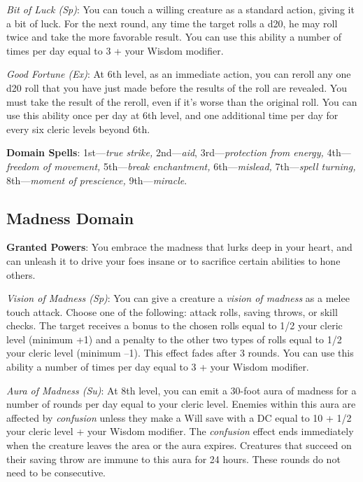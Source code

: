 \textit{Bit of Luck (Sp)}: You can touch a willing creature as a standard action, giving it a bit of luck. For 
the next round, any time the target rolls a d20, he may roll twice and take the more favorable result. You can 
use this ability a number of times per day equal to 3 + your Wisdom modifier.

\textit{Good Fortune (Ex)}: At 6th level, as an immediate action, you can reroll any one d20 roll that you have 
just made before the results of the roll are revealed. You must take the result of the reroll, even if it's worse
than the original roll. You can use this ability once per day at 6th level, and one additional time per day for 
every six cleric levels beyond 6th.

\textbf{Domain Spells}: 1st---\textit{true strike, }2nd---\textit{aid}, 3rd---\textit{protection from energy, }4th---\textit{freedom of movement, }5th---\textit{break enchantment, }6th---\textit{mislead, }7th---\textit{spell turning, }8th---\textit{moment of prescience, }9th---\textit{miracle}.

\subsection{Madness Domain}


\textbf{Granted Powers}: You embrace the madness that lurks deep in your heart, and can unleash it to drive your
foes insane or to sacrifice certain abilities to hone others.

\textit{Vision of Madness (Sp)}: You can give a creature a \textit{vision of madness} as a melee touch attack. 
Choose one of the following: attack rolls, saving throws, or skill checks. The target receives a bonus to the 
chosen rolls equal to 1/2 your cleric level (minimum +1) and a penalty to the other two types of rolls equal to 
1/2 your cleric level (minimum --1). This effect fades after 3 rounds. You can use this ability a number of times
per day equal to 3 + your Wisdom modifier.
				
\textit{Aura of Madness (Su)}: At 8th level, you can emit a 30-foot aura of madness for a number of rounds per day
equal to your cleric level. Enemies within this aura are affected by \textit{confusion} unless they make a Will 
save with a DC equal to 10 + 1/2 your cleric level + your Wisdom modifier. The \textit{confusion }effect ends 
immediately when the creature leaves the area or the aura expires. Creatures that succeed on their saving throw 
are immune to this aura for 24 hours. These rounds do not need to be consecutive.
				
